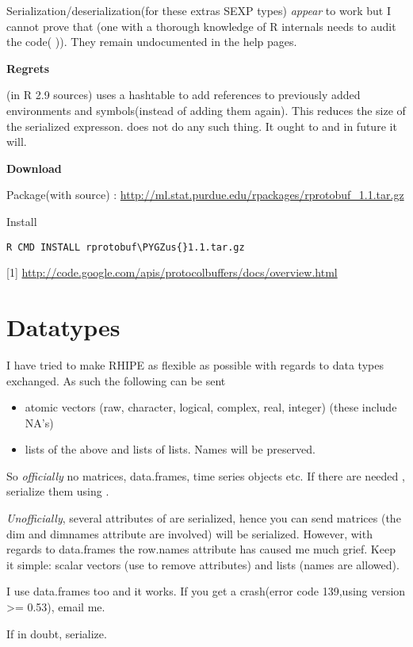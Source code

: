 \documentclass[letterpaper,10pt,english]{manual}
\def\PYGZus{\char`\_}
\begin{document}
Serialization/deserialization(for these extras SEXP types)  \emph{appear} to work but I cannot prove that (one with a thorough knowledge of R internals needs to audit the code(  )). They remain undocumented in the help pages.

\textbf{Regrets}

 (in R 2.9 sources) uses a hashtable to add references to previously added environments and symbols(instead of adding them again). This reduces the size of the serialized expresson.  does not do any such thing. It ought to and in future it will.

\textbf{Download}

Package(with source) : \href{http://ml.stat.purdue.edu/rpackages/rprotobuf\_1.1.tar.gz}{http://ml.stat.purdue.edu/rpackages/rprotobuf\_1.1.tar.gz}

Install

\begin{Verbatim}[commandchars=\\\{\}]
R CMD INSTALL rprotobuf\PYGZus{}1.1.tar.gz
\end{Verbatim}

{[}1{]} \href{http://code.google.com/apis/protocolbuffers/docs/overview.html}{http://code.google.com/apis/protocolbuffers/docs/overview.html}

\resetcurrentobjects
\hypertarget{--doc-datatypes}{}

\chapter{Datatypes}

I have tried to make RHIPE as flexible as possible with regards to data types exchanged. As such the following can be sent
\begin{itemize}
\item {} 
atomic vectors (raw, character, logical, complex, real, integer) (these include NA's)

\item {} 
lists of the above and lists of lists. Names will be preserved.

\end{itemize}

So \emph{officially} no matrices, data.frames, time series objects etc. If there are needed , serialize them using  .

\emph{Unofficially}, several attributes of are serialized, hence you can send matrices (the dim and  dimnames attribute are involved) will be serialized.
However, with regards to data.frames the row.names attribute has caused me much grief. Keep it simple: scalar vectors (use  to remove attributes) and lists (names are allowed).

I use data.frames too and it works. If you get a crash(error code 139,using version \textgreater{}= 0.53), email me.

If in doubt, serialize.


\renewcommand{\indexname}{Module Index}
\printmodindex
\renewcommand{\indexname}{Index}
\printindex
\end{document}
